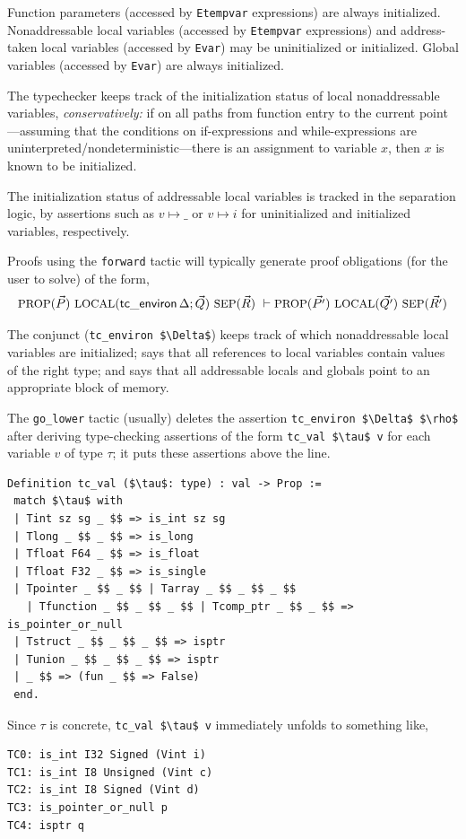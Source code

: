 \documentclass[12pt,fleqn,openany,oneside,showtrims]{memoir}
\begin{document}
Function parameters (accessed by
\lstinline{Etempvar} expressions)
are always initialized.
Nonaddressable local variables (accessed by
\lstinline{Etempvar} expressions) and address-taken local variables
(accessed by \lstinline{Evar})
may be uninitialized or initialized.
Global variables (accessed by \lstinline{Evar}) are always
initialized.

The typechecker keeps track of the
initialization status of local nonaddressable
variables, \emph{conservatively:}
if on all paths from function entry to the current
point---assuming that the conditions on if-expressions
and while-expressions are uninterpreted/nondeterministic---there
is an assignment to variable $x$, then $x$ is known to
be initialized.

The initialization status of addressable local variables
is tracked in the separation logic,
by assertions such as $v \mapsto \_$
or $v \mapsto i$ for uninitialized and initialized variables,
respectively.

Proofs using the \lstinline{forward} tactic will typically
generate proof obligations (for the user to solve)
of the form,
\[
\mbox{\small PROP}(\vec{P})~
\mbox{\small LOCAL}(\mathsf{tc\_environ}\,\Delta; \vec{Q})~
\mbox{\small SEP}(\vec{R})
~\vdash
\mbox{\small PROP}(\vec{P'})~
\mbox{\small LOCAL}(\vec{Q'})~
\mbox{\small SEP}(\vec{R'})
\]

The conjunct (\lstinline{tc_environ $\Delta$})
keeps track of which nonaddressable local variables are initialized;
says that all references to local variables
contain values of the right type;
and says that all addressable locals and globals point
to an appropriate block of memory.

The \lstinline{go_lower} tactic
(usually) deletes the assertion
\lstinline{tc_environ $\Delta$ $\rho$}
after deriving type-checking assertions of the form
\lstinline{tc_val $\tau$ v}
for each variable $v$ of type $\tau$;
it puts these assertions above the line.
\pagebreak
\begin{lstlisting}
Definition tc_val ($\tau$: type) : val -> Prop :=
 match $\tau$ with
 | Tint sz sg _ $$ => is_int sz sg
 | Tlong _ $$ _ $$ => is_long
 | Tfloat F64 _ $$ => is_float
 | Tfloat F32 _ $$ => is_single
 | Tpointer _ $$ _ $$ | Tarray _ $$ _ $$ _ $$
   | Tfunction _ $$ _ $$ _ $$ | Tcomp_ptr _ $$ _ $$ => is_pointer_or_null
 | Tstruct _ $$ _ $$ _ $$ => isptr
 | Tunion _ $$ _ $$ _ $$ => isptr
 | _ $$ => (fun _ $$ => False)
 end.
\end{lstlisting}
Since $\tau$ is concrete, \lstinline{tc_val $\tau$ v}
immediately unfolds
to something like,
\begin{lstlisting}
TC0: is_int I32 Signed (Vint i)
TC1: is_int I8 Unsigned (Vint c)
TC2: is_int I8 Signed (Vint d)
TC3: is_pointer_or_null p
TC4: isptr q
\end{lstlisting}
\end{document}

